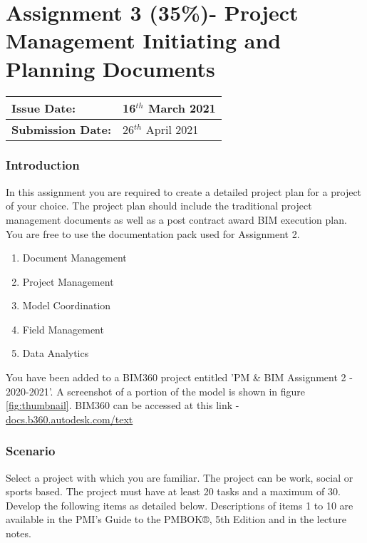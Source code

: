 
	

\part*{Assignment 3 (35\%)- Project Management Initiating and Planning Documents}


\begin{tabularx}{\textwidth}{ |X|X| }
	\hline
	\textbf{Issue Date:} & 16$^{th}$ March 2021\\
	\hline 
	\textbf{Submission Date:}  & 26$^{th}$ April 2021\\
	\hline
\end{tabularx}

\section*{Introduction}

In this assignment you are required to create a detailed project plan for a project of your choice.  The project plan should include the traditional project management documents as well as a post contract award BIM execution plan.  You are free to use the documentation pack used for Assignment 2.\\

\begin{enumerate}
	\item Document Management 
	\item Project Management
	\item Model Coordination
	\item Field Management
	\item Data Analytics
\end{enumerate}

You have been added to a BIM360 project entitled 'PM \& BIM Assignment 2 - 2020-2021'.  A screenshot of a portion of the model is shown in figure \ref{fig:thumbnail}.  BIM360 can be accessed at this link - \href{https://docs.b360.autodesk.com/}{docs.b360.autodesk.com/text}


\section*{Scenario}

Select a project with which you are familiar. The project can be work, social or sports based.  The project must have at least 20 tasks and a maximum of 30.\\

Develop the following items as detailed below. Descriptions of items 1 to 10 are available in the PMI’s Guide to the PMBOK®, 5th Edition and in the lecture notes.\\

